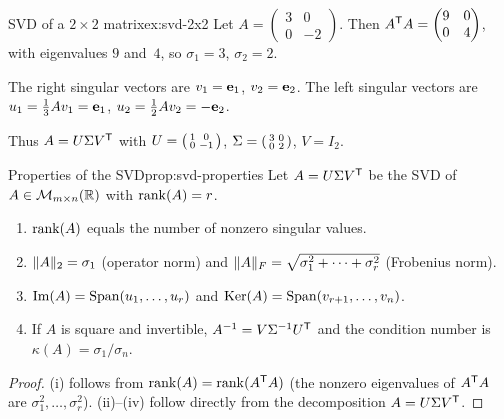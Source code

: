 \begin{example}{SVD of a $2\times 2$ matrix}{ex:svd-2x2}
Let $A = \begin{pmatrix}3&0\\0&-2\end{pmatrix}$.  Then
${A}^{\mathsf{T}}A = \begin{pmatrix}9&0\\0&4\end{pmatrix}$, with
eigenvalues $9$ and~$4$, so $\sigma_1=3$, $\sigma_2=2$.

The right singular vectors are $v_1=\mathbf{e}_{1}$, $v_2=\mathbf{e}_{2}$.
The left singular vectors are
$u_1 = \frac{1}{3}Av_1 = \mathbf{e}_{1}$,
$u_2 = \frac{1}{2}Av_2 = -\mathbf{e}_{2}$.

Thus $A = U\Sigma{V}^{\mathsf{T}}$ with $U=\begin{psmallmatrix}1&0\\0&-1\end{psmallmatrix}$,
$\Sigma=\begin{psmallmatrix}3&0\\0&2\end{psmallmatrix}$, $V=I_2$.
\end{example}

\begin{proposition}{Properties of the SVD}{prop:svd-properties}
Let $A = U\Sigma{V}^{\mathsf{T}}$ be the SVD of $A\in\mathcal{M}_{m\times n}({\mathbb{R}})$
with $\operatorname{rank}(A)=r$.
\begin{enumerate}[label=\textup{(\roman*)}]
  \item $\operatorname{rank}(A)$ equals the number of nonzero singular values.
  \item $\lVert A\rVert_2 = \sigma_1$ (operator norm) and
    $\lVert A\rVert_F = \sqrt{\sigma_1^2+\cdots+\sigma_r^2}$ (Frobenius norm).
  \item $\operatorname{Im}(A) = \operatorname{Span}(u_1,\ldots,u_r)$ and
    $\operatorname{Ker}(A) = \operatorname{Span}(v_{r+1},\ldots,v_n)$.
  \item If $A$ is square and invertible, ${A}^{-1} = V{\Sigma}^{-1}{U}^{\mathsf{T}}$
    and the condition number is $\kappa(A) = \sigma_1/\sigma_n$.
\end{enumerate}
\end{proposition}

\begin{proof}
(i) follows from $\operatorname{rank}(A) = \operatorname{rank}({A}^{\mathsf{T}}A)$ (the nonzero
eigenvalues of ${A}^{\mathsf{T}}A$ are $\sigma_1^2,\ldots,\sigma_r^2$).
(ii)--(iv) follow directly from the decomposition $A=U\Sigma{V}^{\mathsf{T}}$.
\end{proof}



